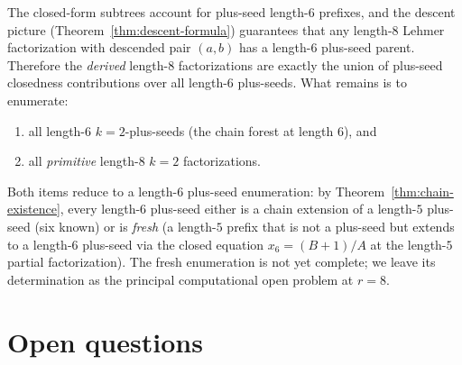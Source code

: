 \documentclass[11pt]{article}
\theoremstyle{definition}
\theoremstyle{remark}
\begin{document}
The closed-form subtrees account for plus-seed length-$6$ prefixes,
and the descent picture (Theorem~\ref{thm:descent-formula})
guarantees that any length-$8$ Lehmer factorization with descended
pair $(a, b)$ has a length-$6$ plus-seed parent.  Therefore the
\emph{derived} length-$8$ factorizations are exactly the union of
plus-seed closedness contributions over all length-$6$ plus-seeds.
What remains is to enumerate:
\begin{enumerate}[label=(\roman*)]
  \item all length-$6$ $k = 2$-plus-seeds (the chain forest at
    length $6$), and
  \item all \emph{primitive} length-$8$ $k = 2$ factorizations.
\end{enumerate}
Both items reduce to a length-$6$ plus-seed enumeration: by
Theorem~\ref{thm:chain-existence}, every length-$6$ plus-seed either
is a chain extension of a length-$5$ plus-seed (six known) or is
\emph{fresh} (a length-$5$ prefix that is not a plus-seed but
extends to a length-$6$ plus-seed via the closed equation
$x_6 = (B + 1)/A$ at the length-$5$ partial factorization).  The
fresh enumeration is not yet complete; we leave its determination
as the principal computational open problem at $r = 8$.


\section{Open questions}
\end{document}
